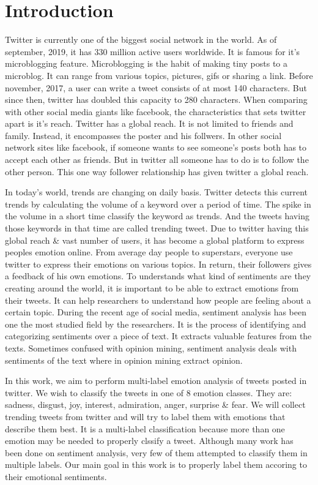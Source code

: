 \documentclass[12pt,a4paper]{article}
\begin{document}
\section{Introduction}
\par \noindent Twitter is currently one of the biggest social network in the world. As of september, 2019, it has 330 million active users worldwide. It is famous for it's microblogging feature. Microblogging is the habit of making tiny posts to a microblog. It can range from various topics, pictures, gifs or sharing a link. Before november, 2017, a user can write a tweet consists of at most 140 characters. But since then, twitter has doubled this capacity to 280 characters. When comparing with other social media giants like facebook, the characteristics that sets twitter apart is it's reach. Twitter has a global reach. It is not limited to friends and family. Instead, it encompasses the poster and his follwers. In other social network sites like facebook, if someone wants to see someone's posts both has to accept each other as friends. But in twitter all someone has to do is to follow the other person. This one way follower relationship has given twitter a global reach. 
\par \noindent In today's world, trends are changing on daily basis. Twitter detects this current trends by calculating the volume of a keyword over a period of time. The spike in the volume in a short time classify the keyword as trends. And the tweets having those keywords in that time are called trending tweet. Due to twitter having this global reach \& vast number of users, it has become a global platform to express peoples emotion online. From average day people to superstars, everyone use twitter to express their emotions on various topics. In return, their followers gives a feedback of his own emotions. To understands what kind of sentiments are they creating around the world, it is important to be able to extract emotions from their tweets. It can help researchers to understand how people are feeling about a certain topic.  During the recent age of social media, sentiment analysis has been one the most studied field by the researchers. It is the process of identifying and categorizing sentiments over a piece of text. It extracts valuable features from the texts. Sometimes confused with opinion mining, sentiment analysis deals with sentiments of the text where in opinion mining extract opinion.
\par \noindent In this work, we aim to perform multi-label emotion analysis of tweets posted in twitter. We wish to classify the tweets in one of 8 emotion classes. They are: sadness, disgust, joy, interest, admiration, anger, surprise \& fear. We will collect trending tweets from twitter and will try to label them with emotions that describe them best. It is a multi-label classification because more than one emotion may be needed to properly clssify a tweet. Although many work has been done on sentiment analysis, very few of them attempted to classify them in multiple labels. Our main goal in this work is to properly label them accoring to their emotional sentiments.
\end{document}
